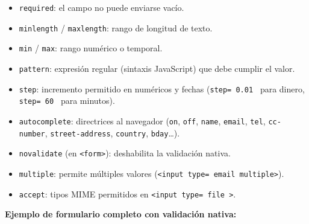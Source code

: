 \begin{itemize}
\item \texttt{required}: el campo no puede enviarse vacío.
\item \texttt{minlength} / \texttt{maxlength}: rango de longitud de
texto.
\item \texttt{min} / \texttt{max}: rango numérico o temporal.
\item \texttt{pattern}: expresión regular (sintaxis JavaScript) que
debe cumplir el valor.
\item \texttt{step}: incremento permitido en numéricos y fechas
(\texttt{step= 0.01 } para dinero, \texttt{step= 60 } para minutos).
\item \texttt{autocomplete}: directrices al navegador (\texttt{on},
\texttt{off}, \texttt{name}, \texttt{email}, \texttt{tel},
\texttt{cc-number}, \texttt{street-address}, \texttt{country},
\texttt{bday}\dots).
\item \texttt{novalidate} (en \texttt{<form>}): deshabilita la
validación nativa.
\item \texttt{multiple}: permite múltiples valores
(\texttt{<input type= email  multiple>}).
\item \texttt{accept}: tipos MIME permitidos en \texttt{<input
type= file >}.
\end{itemize}

\textbf{Ejemplo de formulario completo con validación nativa:}

